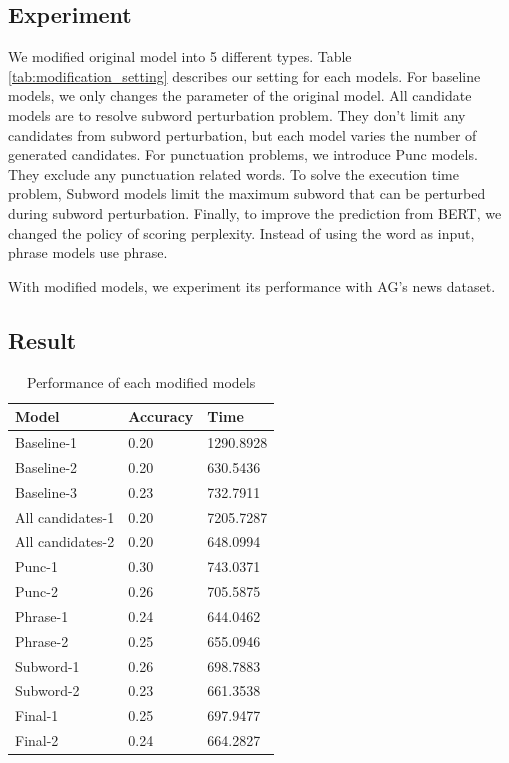 \documentclass[11pt,a4paper]{article}
\begin{document}
\subsection{Experiment}

We modified original model into 5 different types.
Table \ref{tab:modification_setting} describes our setting for each models.
For baseline models, we only changes the parameter of the original model.
All candidate models are to resolve subword perturbation problem. They don't limit any candidates from subword perturbation, but each model varies the number of generated candidates.
For punctuation problems, we introduce Punc models. They exclude any punctuation related words.
To solve the execution time problem, Subword models limit the maximum subword that can be perturbed during subword perturbation.
Finally, to improve the prediction from BERT, we changed the policy of scoring perplexity. Instead of using the word as input, phrase models use phrase.


With modified models, we experiment its performance with AG's news dataset. 

\subsection{Result}
\label{sec:improvement}
\begin{table}[hbt!]
\begin{tabularx}{\columnwidth}{X|l|l}
\hline
\textbf{Model}   & \textbf{Accuracy} & \textbf{Time}     \\ \hline
Baseline-1       & 0.20     & 1290.8928 \\ \hline
Baseline-2       & 0.20     & 630.5436  \\ \hline
Baseline-3       & 0.23     & 732.7911  \\ \hline
All candidates-1 & 0.20     & 7205.7287 \\ \hline
All candidates-2 & 0.20     & 648.0994  \\ \hline
Punc-1           & 0.30     & 743.0371  \\ \hline
Punc-2           & 0.26     & 705.5875  \\ \hline
Phrase-1         & 0.24     & 644.0462  \\ \hline
Phrase-2         & 0.25     & 655.0946  \\ \hline
Subword-1        & 0.26     & 698.7883  \\ \hline
Subword-2        & 0.23     & 661.3538  \\ \hline
Final-1          & 0.25     & 697.9477  \\ \hline
Final-2          & 0.24     & 664.2827  \\ \hline
\end{tabularx}
\caption{Performance of each modified models}
\label{tab:result_modification}
\end{table}
\end{document}

